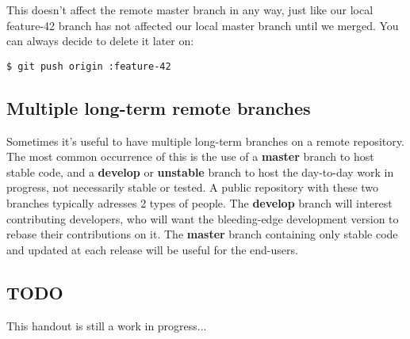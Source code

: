 \documentclass{../common/tufte-latex/tufte-handout}
\begin{document}
This doesn't affect the remote master branch in any way, just like our local feature-42 branch has not affected our local master branch until we merged.
You can always decide to delete it later on:
\begin{lstlisting}[style=BashInputStyle]
  $ git push origin :feature-42
\end{lstlisting}

\subsection{Multiple long-term remote branches}
Sometimes it's useful to have multiple long-term branches on a remote repository.
The most common occurrence of this is the use of a \textbf{master} branch to host stable code, and a \textbf{develop} or \textbf{unstable} branch to host the day-to-day work in progress, not necessarily stable or tested.
A public repository with these two branches typically adresses 2 types of people.
The \textbf{develop} branch will interest contributing developers, who will want the bleeding-edge development version to rebase their contributions on it.
The \textbf{master} branch containing only stable code and updated at each release will be useful for the end-users.

\subsection{TODO}

This handout is still a work in progress...



\end{document}
